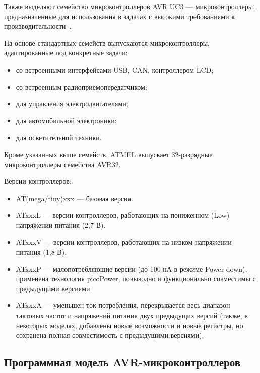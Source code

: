 \documentclass[12pt, oneside]{altsu-report}
\begin{document}
Также выделяют семейство микроконтроллеров AVR UC3 --- микроконтроллеры, предназначенные для использования в задачах с высокими требованиями к производительности~\cite{AVR_2016}.

На основе стандартных семейств выпускаются микроконтроллеры, адаптированные под конкретные задачи:

\begin{itemize}
    \item со встроенными интерфейсами USB, CAN, контроллером LCD;

    \item со встроенным радиоприемопередатчиком;

    \item для управления электродвигателями;

    \item для автомобильной электроники;

    \item для осветительной техники. 
\end{itemize}

Кроме указанных выше семейств, ATMEL выпускает 32-разрядные микроконтроллеры семейства AVR32.

Версии контроллеров:~\cite{kochegarov_trusov}

\begin{itemize}
    \item AT(mega/tiny)xxx --- базовая версия.

    \item ATxxxL --- версии контроллеров, работающих на пониженном (Low) напряжении питания (2,7 В).

    \item ATxxxV --- версии контроллеров, работающих на низком напряжении питания (1,8 В).

    \item ATxxxP --- малопотребляющие версии (до 100 нА в режиме Power-down), применена технология picoPower, повыводно и функционально совместимы с предыдущими версиями.

    \item ATxxxA --- уменьшен ток потребления, перекрывается весь диапазон тактовых частот и напряжений питания двух предыдущих версий (также, в некоторых моделях, добавлены новые возможности и новые регистры, но сохранена полная совместимость с предыдущими версиями).
\end{itemize}

\subsection{Программная модель AVR-микроконтроллеров}
\end{document}
